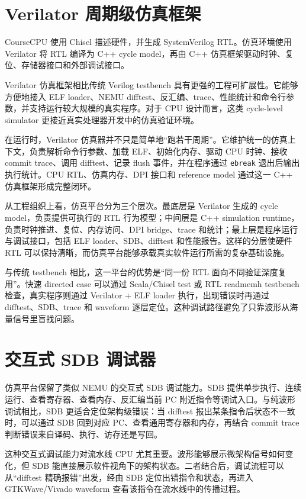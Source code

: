 \documentclass[UTF8,a4paper,12pt]{ctexrep}
\begin{document}
\section{Verilator 周期级仿真框架}

CourseCPU 使用 Chisel 描述硬件，并生成 SystemVerilog RTL。仿真环境使用 Verilator 将 RTL 编译为 C++ cycle model，再由 C++ 仿真框架驱动时钟、复位、存储器接口和外部调试接口。

Verilator 仿真框架相比传统 Verilog testbench 具有更强的工程可扩展性。它能够方便地接入 ELF loader、NEMU difftest、反汇编、trace、性能统计和命令行参数，并支持运行较大规模的真实程序。对于 CPU 设计而言，这类 cycle-level simulator 更接近真实处理器开发中的仿真验证环境。

在运行时，Verilator 仿真器并不只是简单地“跑若干周期”。它维护统一的仿真上下文，负责解析命令行参数、加载 ELF、初始化内存、驱动 CPU 时钟、接收 commit trace、调用 difftest、记录 flush 事件，并在程序通过 \texttt{ebreak} 退出后输出执行统计。CPU RTL、仿真内存、DPI 接口和 reference model 通过这一 C++ 仿真框架形成完整闭环。

从工程组织上看，仿真平台分为三个层次。最底层是 Verilator 生成的 cycle model，负责提供可执行的 RTL 行为模型；中间层是 C++ simulation runtime，负责时钟推进、复位、内存访问、DPI bridge、trace 和统计；最上层是程序运行与调试接口，包括 ELF loader、SDB、difftest 和性能报告。这样的分层使硬件 RTL 可以保持清晰，而仿真平台能够承载真实软件运行所需的复杂基础设施。

与传统 testbench 相比，这一平台的优势是“同一份 RTL 面向不同验证深度复用”。快速 directed case 可以通过 Scala/Chisel test 或 RTL readmemh testbench 检查，真实程序则通过 Verilator + ELF loader 执行，出现错误时再通过 difftest、SDB、trace 和 waveform 逐层定位。这种调试路径避免了只靠波形从海量信号里盲找问题。

\section{交互式 SDB 调试器}

仿真平台保留了类似 NEMU 的交互式 SDB 调试能力。SDB 提供单步执行、连续运行、查看寄存器、查看内存、反汇编当前 PC 附近指令等调试入口。与纯波形调试相比，SDB 更适合定位架构级错误：当 difftest 报出某条指令后状态不一致时，可以通过 SDB 回到对应 PC、查看通用寄存器和内存，再结合 commit trace 判断错误来自译码、执行、访存还是写回。

这种交互式调试能力对流水线 CPU 尤其重要。波形能够展示微架构信号如何变化，但 SDB 能直接展示软件视角下的架构状态。二者结合后，调试流程可以从“difftest 精确报错”出发，经由 SDB 定位出错指令和状态，再进入 GTKWave/Vivado waveform 查看该指令在流水线中的传播过程。
\end{document}
